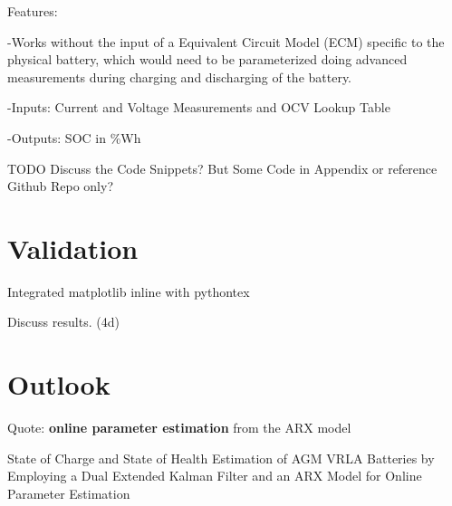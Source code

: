 Features: \

-Works without the input of a Equivalent Circuit Model (ECM) specific to the physical battery, which would need to be parameterized doing advanced measurements during charging and discharging of the battery. 

-Inputs: Current and Voltage Measurements and OCV Lookup Table

-Outputs: SOC in \%Wh

TODO Discuss the Code Snippets? But Some Code in Appendix or reference Github Repo only? 
\chapter{Validation}

Integrated matplotlib inline with pythontex

Discuss results.  (4d)

\chapter{Outlook}
Quote: \textbf{online parameter estimation} from the ARX model 

State of Charge and State of Health Estimation of
AGM VRLA Batteries by Employing a Dual Extended
Kalman Filter and an ARX Model for Online
Parameter Estimation